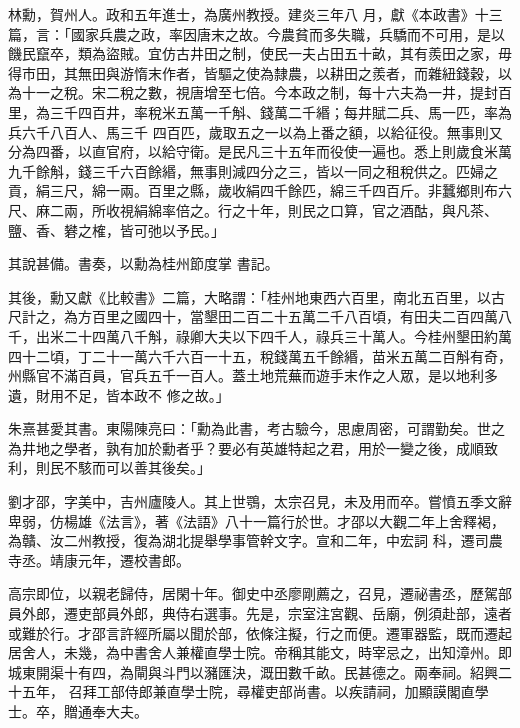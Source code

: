 
\begin{pinyinscope}

 林勳，賀州人。政和五年進士，為廣州教授。建炎三年八
 月，獻《本政書》十三篇，言：「國家兵農之政，率因唐末之故。今農貧而多失職，兵驕而不可用，是以饑民竄卒，類為盜賊。宜仿古井田之制，使民一夫占田五十畝，其有羨田之家，毋得市田，其無田與游惰末作者，皆驅之使為隸農，以耕田之羨者，而雜紐錢穀，以為十一之稅。宋二稅之數，視唐增至七倍。今本政之制，每十六夫為一井，提封百里，為三千四百井，率稅米五萬一千斛、錢萬二千緡；每井賦二兵、馬一匹，率為兵六千八百人、馬三千
 四百匹，歲取五之一以為上番之額，以給征役。無事則又分為四番，以直官府，以給守衛。是民凡三十五年而役使一遍也。悉上則歲食米萬九千餘斛，錢三千六百餘緡，無事則減四分之三，皆以一同之租稅供之。匹婦之貢，絹三尺，綿一兩。百里之縣，歲收絹四千餘匹，綿三千四百斤。非蠶鄉則布六尺、麻二兩，所收視絹綿率倍之。行之十年，則民之口算，官之酒酤，與凡茶、鹽、香、礬之榷，皆可弛以予民。」



 其說甚備。書奏，以勳為桂州節度掌
 書記。



 其後，勳又獻《比較書》二篇，大略謂：「桂州地東西六百里，南北五百里，以古尺計之，為方百里之國四十，當墾田二百二十五萬二千八百頃，有田夫二百四萬八千，出米二十四萬八千斛，祿卿大夫以下四千人，祿兵三十萬人。今桂州墾田約萬四十二頃，丁二十一萬六千六百一十五，稅錢萬五千餘緡，苗米五萬二百斛有奇，州縣官不滿百員，官兵五千一百人。蓋土地荒蕪而遊手末作之人眾，是以地利多遺，財用不足，皆本政不
 修之故。」



 朱熹甚愛其書。東陽陳亮曰：「勳為此書，考古驗今，思慮周密，可謂勤矣。世之為井地之學者，孰有加於勳者乎？要必有英雄特起之君，用於一變之後，成順致利，則民不駭而可以善其後矣。」



 劉才邵，字美中，吉州廬陵人。其上世鶚，太宗召見，未及用而卒。嘗憤五季文辭卑弱，仿楊雄《法言》，著《法語》八十一篇行於世。才邵以大觀二年上舍釋褐，為贛、汝二州教授，復為湖北提舉學事管幹文字。宣和二年，中宏詞
 科，遷司農寺丞。靖康元年，遷校書郎。



 高宗即位，以親老歸侍，居閑十年。御史中丞廖剛薦之，召見，遷祕書丞，歷駕部員外郎，遷吏部員外郎，典侍右選事。先是，宗室注宮觀、岳廟，例須赴部，遠者或難於行。才邵言許經所屬以聞於部，依條注擬，行之而便。遷軍器監，既而遷起居舍人，未幾，為中書舍人兼權直學士院。帝稱其能文，時宰忌之，出知漳州。即城東開渠十有四，為閘與斗門以瀦匯決，溉田數千畝。民甚德之。兩奉祠。紹興二十五年，
 召拜工部侍郎兼直學士院，尋權吏部尚書。以疾請祠，加顯謨閣直學士。卒，贈通奉大夫。




\end{pinyinscope}
